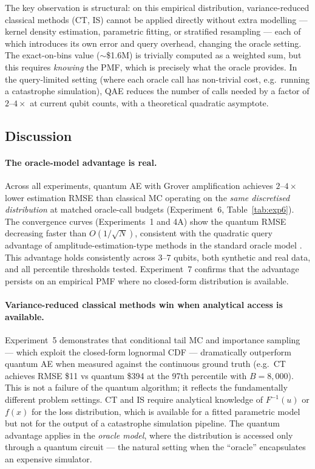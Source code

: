 \documentclass[11pt,a4paper]{article}
\begin{document}
The key observation is structural: on this empirical distribution, variance-reduced classical methods (CT, IS) cannot be applied directly without extra modelling --- kernel density estimation, parametric fitting, or stratified resampling --- each of which introduces its own error and query overhead, changing the oracle setting. The exact-on-bins value ($\sim$\$1.6M) is trivially computed as a weighted sum, but this requires \emph{knowing} the PMF, which is precisely what the oracle provides. In the query-limited setting (where each oracle call has non-trivial cost, e.g.\ running a catastrophe simulation), QAE reduces the number of calls needed by a factor of $2$--$4\times$ at current qubit counts, with a theoretical quadratic asymptote.


\subsection{Discussion}

\paragraph{The oracle-model advantage is real.} Across all experiments, quantum AE with Grover amplification achieves $2$--$4\times$ lower estimation RMSE than classical MC operating on the \emph{same discretised distribution} at matched oracle-call budgets (Experiment~6, Table~\ref{tab:exp6}). The convergence curves (Experiments~1 and 4A) show the quantum RMSE decreasing faster than $O(1/\sqrt{N})$, consistent with the quadratic query advantage of amplitude-estimation-type methods in the standard oracle model \citep{brassard2002quantum}. This advantage holds consistently across 3--7 qubits, both synthetic and real data, and all percentile thresholds tested. Experiment~7 confirms that the advantage persists on an empirical PMF where no closed-form distribution is available.

\paragraph{Variance-reduced classical methods win when analytical access is available.} Experiment~5 demonstrates that conditional tail MC and importance sampling --- which exploit the closed-form lognormal CDF --- dramatically outperform quantum AE when measured against the continuous ground truth (e.g.\ CT achieves RMSE \$11 vs quantum \$394 at the 97th percentile with $B = 8{,}000$). This is not a failure of the quantum algorithm; it reflects the fundamentally different problem settings. CT and IS require analytical knowledge of $F^{-1}(u)$ or $f(x)$ for the loss distribution, which is available for a fitted parametric model but not for the output of a catastrophe simulation pipeline. The quantum advantage applies in the \emph{oracle model}, where the distribution is accessed only through a quantum circuit --- the natural setting when the ``oracle'' encapsulates an expensive simulator.
\end{document}
